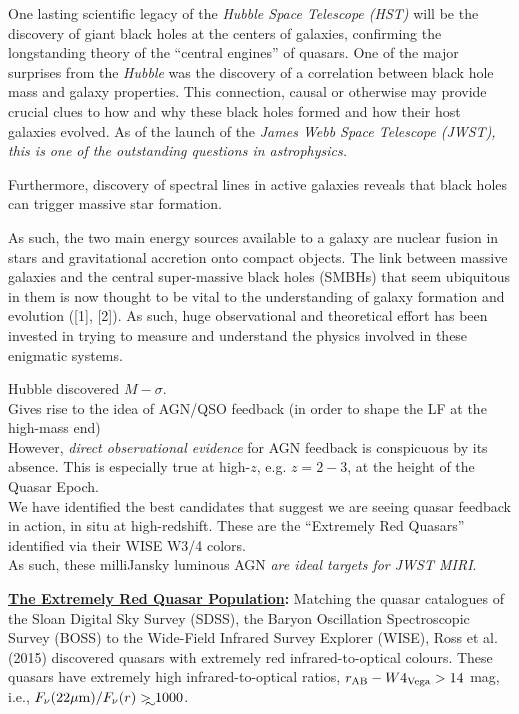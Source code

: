 

One lasting scientific legacy of the {\it Hubble Space Telescope
(HST)} will be the discovery of giant black holes at the centers of
galaxies, confirming the longstanding theory of the ``central
engines'' of quasars. One of the major surprises from the {\it Hubble}
was the discovery of a correlation between black hole mass and galaxy
properties.  This connection, causal or otherwise may provide crucial
clues to how and why these black holes formed and how their host
galaxies evolved. As of the launch of the {\it James Webb Space
Telescope (JWST), this is one of the outstanding questions in
astrophysics.}

Furthermore, discovery of spectral lines in active galaxies reveals that black holes can trigger massive star formation.

As such, the two main energy sources available to a galaxy are nuclear fusion in stars and gravitational accretion onto compact objects. 
The link between massive galaxies and the central super-massive black holes (SMBHs) that seem ubiquitous in them is now thought to be vital to the understanding of galaxy formation and evolution ([1], [2]).  As such, huge observational and theoretical effort has been invested in trying to measure and understand the physics involved in these enigmatic systems.


Hubble discovered $M-\sigma$. \\
Gives rise to the idea of AGN/QSO feedback (in order to shape the LF at the high-mass end)\\
However, {\it direct observational evidence} for AGN feedback is conspicuous by its absence. This is especially true at high-$z$, e.g. $z=2-3$, at the height of the Quasar Epoch. \\
We have identified the best candidates that suggest we are seeing quasar feedback in action, in situ at high-redshift. These are the ``Extremely Red Quasars'' identified via their WISE W3/4 colors. \\
As such, these milliJansky luminous AGN {\it are ideal targets for JWST MIRI}. 


\medskip
\medskip

\smallskip
\smallskip
\noindent
{\bf \underline{The Extremely Red Quasar Population}:}
Matching the quasar catalogues of the Sloan Digital Sky Survey (SDSS), the Baryon Oscillation Spectroscopic Survey (BOSS) to the Wide-Field Infrared Survey Explorer (WISE), Ross et al. (2015) discovered quasars with extremely red infrared-to-optical colours. 
These quasars have extremely high infrared-to-optical ratios, $r_{\rm AB}-W4_{\rm Vega}>14$ mag, 
i.e., $F_\nu({\rm 22\mu m})/F_\nu(r) \gtrsim 1000$. 

